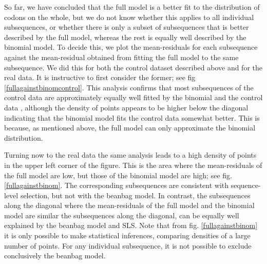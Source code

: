 \documentclass[a4paper,10pt]{paper}%
\begin{document}
So far, we have concluded that  the full model is a better fit to the distribution of codons on the whole, but we do not know whether this applies to all  individual subsequences, or  whether  there is only a subset of subsequences that is better described by the full model, whereas the rest is equally well described by the binomial model. To decide this, we plot the mean-residuals for each subsequence against the  mean-residual obtained from fitting  the full model to the same subsequence. We did this for both the control dataset described above and for the real data.  It is instructive to first consider  the former; see fig \ref{fullagainstbinomcontrol}. 
This  analysis confirms that most subsequences of the control data are approximately equally well fitted by the binomial and the control data %
, although the density of points appears to be higher below the diagonal indicating that the binomial model fits the control data somewhat better. This is because, as mentioned above, the full model can only approximate the binomial distribution. 
\par
Turning now to the real data  the same analysis leads to a high density of points in the upper left corner of the figure. This is the area where   the  mean-residuals of the  full model are low, but those of the binomial model are high; see  fig. \ref{fullagainstbinom}.  The corresponding subsequences are  consistent with sequence-level selection, but not with the beanbag model. In contrast, the subsequences along the diagonal  where the mean-residuals of the full model and the binomial model are similar  the subsequences along the diagonal,  can be equally well explained by the beanbag model and SLS.  Note that  from fig. \ref{fullagainstbinom} it is only possible to make statistical inferences, comparing densities of a large number of points. For any individual subsequence, it is not possible to exclude conclusively the beanbag model.
\par
%
%
\end{document}
